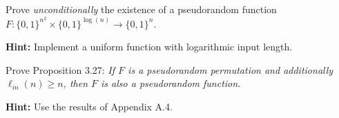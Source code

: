 \documentclass[a4paper,10pt,landscape,twocolumn]{scrartcl}
\begin{document}
\begin{exercise}
  Prove \emph{unconditionally} the existence of a pseudorandom function $F : \{0,1\}^{n^2} \times \{0,1\}^{\log(n)} \to \{0,1\}^n$.

  \textbf{Hint:} Implement a uniform function with logarithmic input length.
\end{exercise}



\begin{bonusexercise}
  Prove Proposition 3.27:
  \textit{
If $F$ is a pseudorandom permutation and additionally $\ell_{in}(n) \geq n$, then $F$ is also a pseudorandom function.
  }
  
\textbf{Hint:} Use the results of Appendix A.4.
\end{bonusexercise}
\end{document}
